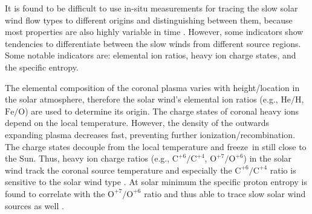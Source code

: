 It is found to be difficult to use in-situ measurements for tracing the slow solar wind flow types to different origins and distinguishing between them, because most properties are also highly variable in time \citep{Kilpua2016}. However, some indicators show tendencies to differentiate between the slow winds from different source regions. Some notable indicators are: elemental ion ratios, heavy ion charge states, and the specific entropy.

The elemental composition of the coronal plasma varies with height/location in the solar atmosphere, therefore the solar wind's elemental ion ratios (e.g., $\text{He}/\text{H}$, $\text{Fe}/\text{O}$) are used to determine its origin.
The charge states of coronal heavy ions depend on the local temperature. However, the density of the outwards expanding plasma decreases fast, preventing further ionization/recombination. The charge states decouple from the local temperature and freeze~in still close to the Sun. Thus, heavy ion charge ratios (e.g., $\text{C}^{+6}\!/\text{C}^{+4}$, $\text{O}^{+7}\!/\text{O}^{+6}$) in the solar wind track the coronal source temperature and especially the $\text{C}^{+6}\!/\text{C}^{+4}$ ratio is sensitive to the solar wind type \citep{Landi2012}.
At solar minimum the specific proton entropy is found to correlate with the $\text{O}^{+7}\!/\text{O}^{+6}$ ratio and thus able to trace slow solar wind sources as well \citep{Pagel2004}.

